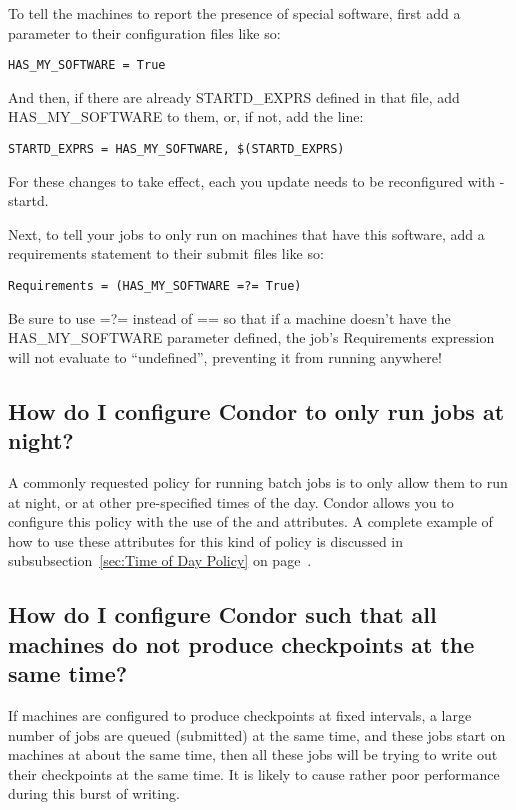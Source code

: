 To tell the machines to report the presence of special software, first
add a parameter to their configuration files like so:

\begin{verbatim}
HAS_MY_SOFTWARE = True
\end{verbatim}

And then, if there are already STARTD\_EXPRS defined in that file, add
HAS\_MY\_SOFTWARE to them, or, if not, add the line:

\footnotesize
\begin{verbatim}
STARTD_EXPRS = HAS_MY_SOFTWARE, $(STARTD_EXPRS)
\end{verbatim}
\normalsize

\Note For these changes to take effect, each  you update
needs to be reconfigured with  -startd.

Next, to tell your jobs to only run on machines that have this
software, add a requirements statement to their submit files like so:

\footnotesize
\begin{verbatim}
Requirements = (HAS_MY_SOFTWARE =?= True)
\end{verbatim}
\normalsize

\Note Be sure to use =?= instead of == so that if a machine doesn't have
the HAS\_MY\_SOFTWARE parameter defined, the job's Requirements
expression will not evaluate to ``undefined'', preventing it from
running anywhere!


\subsection*{How do I configure Condor to only run jobs at night?}

A commonly requested policy for running batch jobs is to only allow
them to run at night, or at other pre-specified times of the day.
Condor allows you to configure this policy with the use of the
 and   attributes.  
A complete example of how to use these attributes for this kind of
policy is discussed in subsubsection~\ref{sec:Time of Day Policy} on
page~\pageref{sec:Time of Day Policy}.


\subsection*{How do I configure Condor such that all machines do not produce checkpoints at the same time?}
\label{sec:randomintegerusage}
If machines are configured to produce checkpoints at fixed intervals,
a large number of jobs are queued (submitted) at the same time,
and these jobs start on machines at about the same time,
then all these jobs will be trying to write out their checkpoints
at the same time.
It is likely to cause rather poor performance during this burst of
writing.

